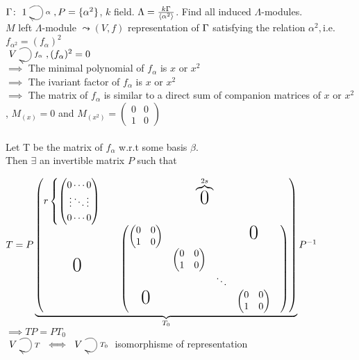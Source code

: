 \begin{exam}
$\G\colon \xymatrix{1 \ar@(ur,dr)^\alpha}, P=\{\alpha^2 \}$, $k$ field. $ \Lambda=\frac{k\Gamma}{\langle\alpha^2\rangle}$. Find all induced $\Lambda$-modules.\\
$M$ left $\Lambda$-module $\leadsto 
(V,f) $ representation of $\Gamma$ satisfying the relation $\alpha^2, $i.e.  $ f_{\alpha^2}=(f_\alpha)^2$\\  
	
	$\xymatrix{V \ar@(ur,dr)^{f_\alpha}}, (f_\alpha)^2=0$\\\newline
	$\implies$ The minimal polynomial of $f_\alpha$ is $x$ or $x^2$\\
	$\implies$ The ivariant factor of $f_\alpha$ is $x$ or $x^2$\\
	$\implies$ The matrix of $f_\alpha$ is similar to a direct sum of companion matrices of $x$ or $x^2$, $M_{(x)}=0$ and $M_{(x^2)}= \begin{pmatrix}0&0\\1&0\end{pmatrix}$\\~\\
	
Let T be the matrix of $f_\alpha$ w.r.t some basis $\beta$.\\
Then $\exists$ an invertible matrix $P$ such that\newline
	
$ T = P \underbrace{ \begin{pmatrix} r\begin{cases} \begin{pmatrix} 0 \cdots 0  \\\vdots \ddots \vdots \\0 \cdots 0 \end{pmatrix} \end{cases} & \overbrace{\text{\huge0}}^{2s}\\\text{\huge0} & 
\begin{pmatrix}  
\begin{pmatrix} 0 & 0\\ 1 & 0\\ \end{pmatrix} & & & \text{\huge0}  \\
& \begin{pmatrix} 0 & 0\\ 1 & 0\\ \end{pmatrix} & & \\
& &\ddots &  & \\
\text{\huge0} & & &\begin{pmatrix} 0 & 0\\ 1 & 0\\ \end{pmatrix} \\
\end{pmatrix} \end{pmatrix}}_{T_0}P^{-1} $ \\$\implies TP= PT_0$ \nolinebreak[4]\\\newline
$\xymatrix{V \ar@(ur,dr)^{T}} \iff \xymatrix{V \ar@(ur,dr)^{T_0}}$ isomorphisme of representation


\end{exam}

